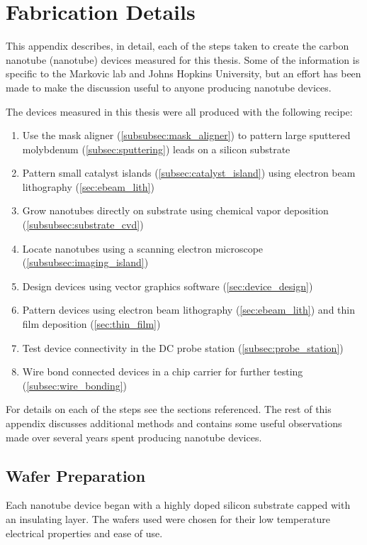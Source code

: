 \chapter{Fabrication Details}
\label{chap:fabrication}

This appendix describes, in detail, each of the steps taken to create the carbon nanotube (nanotube) devices measured for this thesis. Some of the information is specific to the Markovic lab and Johns Hopkins University, but an effort has been made to make the discussion useful to anyone producing nanotube devices.

The devices measured in this thesis were all produced with the following recipe:

\begin{enumerate}
\item Use the mask aligner (\ref{subsubsec:mask_aligner}) to pattern large sputtered molybdenum (\ref{subsec:sputtering}) leads on a silicon substrate
\item Pattern small catalyst islands (\ref{subsec:catalyst_island}) using electron beam lithography (\ref{sec:ebeam_lith})
\item Grow nanotubes directly on substrate using chemical vapor deposition (\ref{subsubsec:substrate_cvd})
\item Locate nanotubes using a scanning electron microscope (\ref{subsubsec:imaging_island})
\item Design devices using vector graphics software (\ref{sec:device_design})
\item Pattern devices using electron beam lithography (\ref{sec:ebeam_lith}) and thin film deposition (\ref{sec:thin_film})
\item Test device connectivity in the DC probe station (\ref{subsec:probe_station})
\item Wire bond connected devices in a chip carrier for further testing (\ref{subsec:wire_bonding})
\end{enumerate}

For details on each of the steps see the sections referenced. The rest of this appendix discusses additional methods and contains some useful observations made over several years spent producing nanotube devices.

\section{Wafer Preparation}

Each nanotube device began with a highly doped silicon substrate capped with an insulating layer. The wafers used were chosen for their low temperature electrical properties and ease of use.

